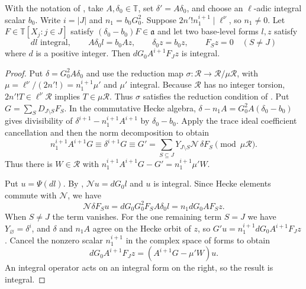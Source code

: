 \begin{lemma}
\label{lem:c-integral-top-coefficient}
\emitthmsource
With the notation of , take $A,\delta_0\in\mathbb T$, set $\delta'=A\delta_0$, and choose an $\ell$-adic integral scalar $b_0$. Write $i=|J|$ and $n_1=b_0G_0^2$.
Suppose $2n'! n_1^{i+1}\mid\ell^\nu$, so $n_1\ne0$.
Let $F\in\mathbb T[X_j:j\in J]$ satisfy $(\delta_0-b_0)F\in\mathfrak a$ and let two base-level forms $l,z$ satisfy
\[
 d l\text{ integral},\qquad
 A\delta_0 l=b_0 A z,\qquad \delta_0 z=b_0 z,
 \qquad F_S z=0\quad(S\ne J)
\]
where $d$ is a positive integer.
Then $dG_0 A^{i+1}F_J z$ is integral.
\end{lemma}
\begin{proof}
Put $\delta=G_0^2 A\delta_0$ and use the reduction map $\sigma:\mathcal R\to\mathcal R/\mu\mathcal R$, with $\mu=\ell^\nu/(2n'!)=n_1^{i+1}\mu'$ and $\mu'$ integral.
Because $\mathcal R$ has no integer torsion, $2n'! T\in\ell^\nu\mathcal R$ implies $T\in\mu\mathcal R$. Thus $\sigma$ satisfies the reduction condition of .
Put $G=\sum_S D_{J\setminus S}F_S$. In the commutative Hecke algebra, $\delta-n_1 A=G_0^2 A(\delta_0-b_0)$ gives divisibility of $\delta^{i+1}-n_1^{i+1}A^{i+1}$ by $\delta_0-b_0$.
Apply the trace ideal coefficient cancellation and then the norm decomposition to obtain
\[
 n_1^{i+1}A^{i+1}G
   \equiv \delta^{i+1}G
   \equiv G'=\sum_{S\subseteq J}Y_{J\setminus S}\mathcal N\,\delta F_S
       \pmod{\mu\mathcal R}.
\]
Thus there is $W\in\mathcal R$ with $n_1^{i+1}A^{i+1}G-G'=n_1^{i+1}\mu' W$.

Put $u=\Psi(d l)$. By , $\mathcal N u=dG_0 l$ and $u$ is integral.
Since Hecke elements commute with $\mathcal N$, we have
\[
 \mathcal N\delta F_S u
  = dG_0G_0^2 F_S A\delta_0 l
  = n_1dG_0 A F_S z .
\]
When $S\ne J$ the term vanishes. For the one remaining term $S=J$ we have $Y_\varnothing=\delta^i$, and $\delta$ and $n_1 A$ agree on the Hecke orbit of $z$, so $G'u=n_1^{i+1}dG_0 A^{i+1}F_Jz$.
Cancel the nonzero scalar $n_1^{i+1}$ in the complex space of forms to obtain
\[
 dG_0 A^{i+1}F_J z=(A^{i+1}G-\mu'W)u .
\]
An integral operator acts on an integral form on the right, so the result is integral.
\end{proof}

